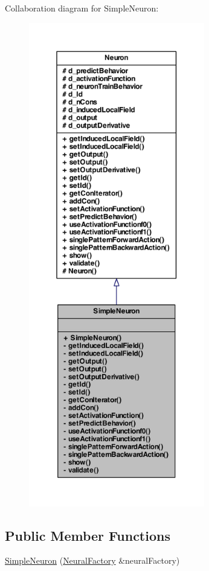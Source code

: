 Collaboration diagram for SimpleNeuron:\nopagebreak
\begin{figure}[H]
\begin{center}
\leavevmode
\includegraphics[height=600pt]{class_simple_neuron__coll__graph}
\end{center}
\end{figure}
\subsection*{Public Member Functions}
\begin{DoxyCompactItemize}
\item 
\hyperlink{class_simple_neuron_adb0becb30ddc511aba5cc7cadea9d981}{SimpleNeuron} (\hyperlink{class_neural_factory}{NeuralFactory} \&neuralFactory)
\end{DoxyCompactItemize}
